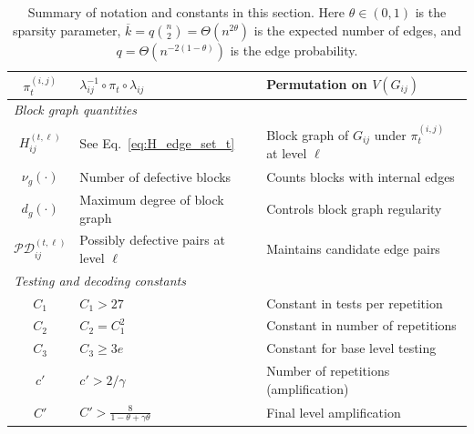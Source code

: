 \documentclass[journal]{IEEEtran}
\theoremstyle{definition}
\theoremstyle{definition}
\newcommand{\kb}{\overline{k}}
\begin{document}
\begin{table}[t]
\begin{tabular}{|c|l|l|}
$\pi_t^{(i,j)}$      & $\lambda_{ij}^{-1} \circ \pi_t \circ \lambda_{ij}$                   & Permutation on $V(G_{ij})$        \\
\hline
\multicolumn{3}{|l|}{\emph{Block graph quantities}} \\
\hline
$H_{ij}^{(t,\ell)}$  & See Eq.~\eqref{eq:H_edge_set_t}                                                          & Block graph of $G_{ij}$ under $\pi_t^{(i,j)}$ at level $\ell$ \\
\hline
$\nu_g(\cdot)$       & Number of defective blocks                                             & Counts blocks with internal edges        \\
\hline
$d_g(\cdot)$         & Maximum degree of block graph                                          & Controls block graph regularity            \\
\hline
$\mathcal{PD}_{ij}^{(t,\ell)}$ & Possibly defective pairs at level $\ell$                      & Maintains candidate edge pairs              \\
\hline
\multicolumn{3}{|l|}{\emph{Testing and decoding constants}} \\
\hline
$C_1$                & $C_1 > 27$                                                             & Constant in tests per repetition      \\
\hline
$C_2$                & $C_2 = C_1^2$                                                          & Constant in number of repetitions     \\
\hline
$C_3$                & $C_3 \geq 3e$                                                          & Constant for base level testing       \\
\hline
$c'$                 & $c' > 2/\gamma$                                                        & Number of repetitions (amplification)\\
\hline
$C'$                 & $C' > \frac{8}{1 - \theta + \gamma\theta}$                             & Final level amplification         \\
\hline
\end{tabular}
\vspace{0.5em}
\caption{Summary of notation and constants in this section. Here $\theta \in (0,1)$ is the sparsity parameter, $\kb = q\binom{n}{2} = \Theta(n^{2\theta})$ is the expected number of edges, and $q = \Theta(n^{-2(1-\theta)})$ is the edge probability.}
\label{tab:sec4-notation}
\end{table}
\end{document}
